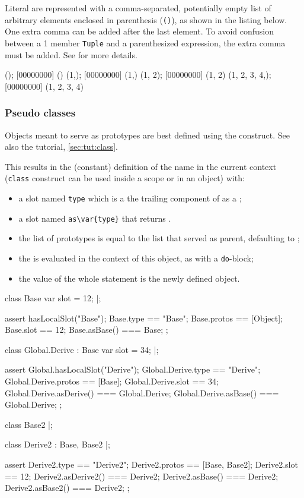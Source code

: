 Literal  are represented with a comma-separated, potentially
empty list of arbitrary elements enclosed in parenthesis (\lstinline|()|),
as shown in the listing below.  One extra comma can be added after the last
element.  To avoid confusion between a 1 member \lstinline{Tuple} and a
parenthesized expression, the extra comma must be added.  See
 for more details.

\begin{urbiscript}
();
[00000000] ()
(1,);
[00000000] (1,)
(1, 2);
[00000000] (1, 2)
(1, 2, 3, 4,);
[00000000] (1, 2, 3, 4)
\end{urbiscript}


\subsubsection{Pseudo classes}
\label{sec:lang:class}

Objects meant to serve as prototypes are best defined using the
 construct.  See also the tutorial, \autoref{sec:tut:class}.



This results in the (constant) definition of the name  in the
current context (\lstinline{class} construct can be used inside a scope or
in an object) with:
\begin{itemize}
\item a slot named \lstinline{type} which is a the trailing component of
   as a ;
\item a slot named \lstinline|as\var{type}| that returns \this.
\item the list of prototypes is equal to the list  that
  served as parent, defaulting to ;
\item the  is evaluated in the context of this object, as with a
  \lstinline{do}-block;
\item the value of the whole statement is the newly defined object.
\end{itemize}

\begin{urbiscript}
class Base
{
  var slot = 12;
}|;

assert
{
  hasLocalSlot("Base");
  Base.type   == "Base";
  Base.protos == [Object];
  Base.slot   == 12;
  Base.asBase() === Base;
};

class Global.Derive : Base
{
  var slot = 34;
}|;

assert
{
  Global.hasLocalSlot("Derive");
  Global.Derive.type     == "Derive";
  Global.Derive.protos   == [Base];
  Global.Derive.slot     == 34;
  Global.Derive.asDerive() === Global.Derive;
  Global.Derive.asBase()   === Global.Derive;
};

class Base2 {}|;

class Derive2 : Base, Base2 {}|;

assert
{
  Derive2.type      == "Derive2";
  Derive2.protos    == [Base, Base2];
  Derive2.slot      == 12;
  Derive2.asDerive2() === Derive2;
  Derive2.asBase()    === Derive2;
  Derive2.asBase2()   === Derive2;
};
\end{urbiscript}

